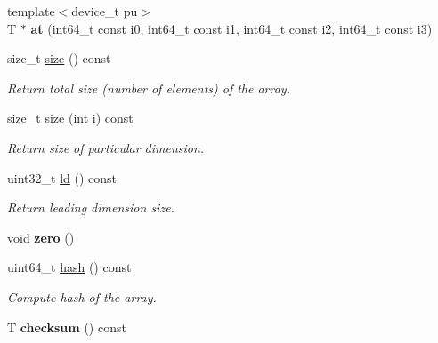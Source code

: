 \begin{DoxyCompactItemize}
\item 
\hypertarget{classsddk_1_1mdarray__base_a2983d377beddb2d85fc923c39df88b82}{}{\footnotesize template$<$device\+\_\+t pu$>$ }\\T $\ast$ {\bfseries at} (int64\+\_\+t const i0, int64\+\_\+t const i1, int64\+\_\+t const i2, int64\+\_\+t const i3)\label{classsddk_1_1mdarray__base_a2983d377beddb2d85fc923c39df88b82}

\item 
size\+\_\+t \hyperlink{classsddk_1_1mdarray__base_a1b42915da1c9dc29e6f7f637a689937c}{size} () const 
\begin{DoxyCompactList}\small\item\em Return total size (number of elements) of the array. \end{DoxyCompactList}\item 
size\+\_\+t \hyperlink{classsddk_1_1mdarray__base_a39d4e3ce482e2037255dbab7e22092be}{size} (int i) const 
\begin{DoxyCompactList}\small\item\em Return size of particular dimension. \end{DoxyCompactList}\item 
uint32\+\_\+t \hyperlink{classsddk_1_1mdarray__base_ab5a0b5f2880a2f6d4533e3ab304b06f3}{ld} () const 
\begin{DoxyCompactList}\small\item\em Return leading dimension size. \end{DoxyCompactList}\item 
\hypertarget{classsddk_1_1mdarray__base_afb774c81e950666c6a3ebdbae284ac5b}{}void {\bfseries zero} ()\label{classsddk_1_1mdarray__base_afb774c81e950666c6a3ebdbae284ac5b}

\item 
uint64\+\_\+t \hyperlink{classsddk_1_1mdarray__base_a065f6cd9d7ffca1f86321c29752bb535}{hash} () const 
\begin{DoxyCompactList}\small\item\em Compute hash of the array. \end{DoxyCompactList}\item 
\hypertarget{classsddk_1_1mdarray__base_a95d8e568aab4295bda7b40dc5af7c5c5}{}T {\bfseries checksum} () const \label{classsddk_1_1mdarray__base_a95d8e568aab4295bda7b40dc5af7c5c5}


\end{DoxyCompactItemize}
